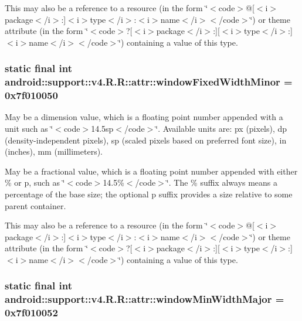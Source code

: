 This may also be a reference to a resource (in the form \char`\"{}$<$code$>$@\mbox{[}$<$i$>$package$<$/i$>$:\mbox{]}$<$i$>$type$<$/i$>$:$<$i$>$name$<$/i$>$$<$/code$>$\char`\"{}) or theme attribute (in the form \char`\"{}$<$code$>$?\mbox{[}$<$i$>$package$<$/i$>$:\mbox{]}\mbox{[}$<$i$>$type$<$/i$>$:\mbox{]}$<$i$>$name$<$/i$>$$<$/code$>$\char`\"{}) containing a value of this type. \hypertarget{classandroid_1_1support_1_1v4_1_1_r_1_1attr_8b94c2369e4fc6589539a752c6ef2341}{
\subsubsection[{windowFixedWidthMinor}]{\setlength{\rightskip}{0pt plus 5cm}static final int android::support::v4.R.R::attr::windowFixedWidthMinor = 0x7f010050}}
\label{classandroid_1_1support_1_1v4_1_1_r_1_1attr_8b94c2369e4fc6589539a752c6ef2341}


May be a dimension value, which is a floating point number appended with a unit such as \char`\"{}$<$code$>$14.5sp$<$/code$>$\char`\"{}. Available units are: px (pixels), dp (density-independent pixels), sp (scaled pixels based on preferred font size), in (inches), mm (millimeters). 

May be a fractional value, which is a floating point number appended with either \% or p, such as \char`\"{}$<$code$>$14.5\%$<$/code$>$\char`\"{}. The \% suffix always means a percentage of the base size; the optional p suffix provides a size relative to some parent container. 

This may also be a reference to a resource (in the form \char`\"{}$<$code$>$@\mbox{[}$<$i$>$package$<$/i$>$:\mbox{]}$<$i$>$type$<$/i$>$:$<$i$>$name$<$/i$>$$<$/code$>$\char`\"{}) or theme attribute (in the form \char`\"{}$<$code$>$?\mbox{[}$<$i$>$package$<$/i$>$:\mbox{]}\mbox{[}$<$i$>$type$<$/i$>$:\mbox{]}$<$i$>$name$<$/i$>$$<$/code$>$\char`\"{}) containing a value of this type. \hypertarget{classandroid_1_1support_1_1v4_1_1_r_1_1attr_e2cd817c2daf3add3a99f8ec23336e15}{
\subsubsection[{windowMinWidthMajor}]{\setlength{\rightskip}{0pt plus 5cm}static final int android::support::v4.R.R::attr::windowMinWidthMajor = 0x7f010052}}
\label{classandroid_1_1support_1_1v4_1_1_r_1_1attr_e2cd817c2daf3add3a99f8ec23336e15}


